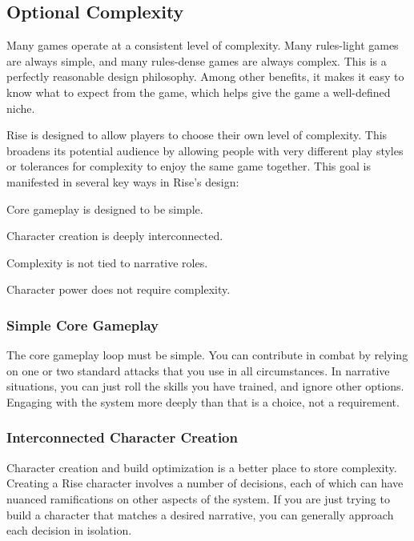   \subsection{Optional Complexity}
    Many games operate at a consistent level of complexity.
    Many rules-light games are always simple, and many rules-dense games are always complex.
    This is a perfectly reasonable design philosophy.
    Among other benefits, it makes it easy to know what to expect from the game, which helps give the game a well-defined niche.

    Rise is designed to allow players to choose their own level of complexity.
    This broadens its potential audience by allowing people with very different play styles or tolerances for complexity to enjoy the same game together.
    This goal is manifested in several key ways in Rise's design:
    \begin{raggeditemize}
      \item Core gameplay is designed to be simple.
      \item Character creation is deeply interconnected.
      \item Complexity is not tied to narrative roles.
      \item Character power does not require complexity.
    \end{raggeditemize}

    \subsubsection{Simple Core Gameplay}
      The core gameplay loop must be simple.
      You can contribute in combat by relying on one or two standard attacks that you use in all circumstances.
      In narrative situations, you can just roll the skills you have trained, and ignore other options.
      Engaging with the system more deeply than that is a choice, not a requirement.

    \subsubsection{Interconnected Character Creation}
      Character creation and build optimization is a better place to store complexity.
      Creating a Rise character involves a number of decisions, each of which can have nuanced ramifications on other aspects of the system.
      If you are just trying to build a character that matches a desired narrative, you can generally approach each decision in isolation.


